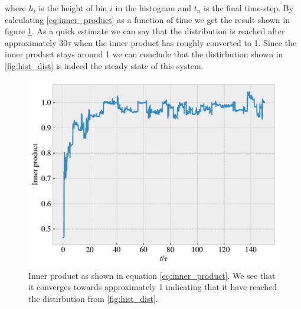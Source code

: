 \documentclass[reprint, amsmath, amssymb, aps]{revtex4-2}
\begin{document}
where $h_i$ is the height of bin $i$ in the histogram and $t_n$ is the final time-step. By calculating \ref{eq:inner_product} as a function of time we get the result shown in figure \ref{fig:inner_product}. As a quick estimate we can say that the distribution is reached after approximately $30 \tau$ when the inner product has roughly converted to 1. Since the inner product stays around 1 we can conclude that the distirbution shown in \ref{fig:hist_dist} is indeed the steady state of this system.
\begin{figure}[H]
  \includegraphics[width=\linewidth]{figures/inner_product.pdf}
  \caption{Inner product as shown in equation \ref{eq:inner_product}. We see that it converges towards approximately 1 indicating that it have reached the distirbution from \ref{fig:hist_dist}.}
  \label{fig:inner_product}
\end{figure}
%
%
\end{document}
